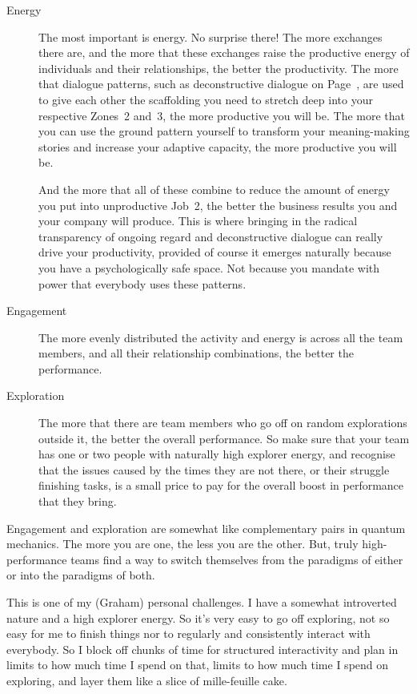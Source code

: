 \begin{description}
\item[Energy] The most important is energy.  No surprise there! The more exchanges there are, and the more that these exchanges raise the productive energy of individuals and their relationships, the better the productivity. The more that dialogue patterns, such as deconstructive dialogue on Page~\pageref{section:deconstructive-criticism}, are used to give each other the scaffolding you need to stretch deep into your respective Zones~2 and~3, the more productive you will be. The more that you can use the ground pattern yourself to transform your meaning\hyp{}making stories and increase your adaptive capacity, the more productive you will be. 


And the more that all of these combine to reduce the amount of energy you put into unproductive Job~2, the better the business results you and your company will produce. This is where bringing in the radical transparency of ongoing regard and deconstructive dialogue can really drive your productivity\cite{mueller-why-larger-teams-perform-worse}, provided of course it emerges naturally because you have a psychologically safe space. Not because you mandate with power that everybody uses these patterns.


\item[Engagement] The more evenly distributed the activity and energy is across all the team members, and all their relationship combinations, the better the performance.


\item[Exploration] The more that there are team members who go off on random explorations outside it, the better the overall performance. So make sure that your team has one or two people with naturally high explorer energy, and recognise that the issues caused by the times they are not there, or their struggle finishing tasks, is a small price to pay for the overall boost in performance that they bring.
\end{description} 


Engagement and exploration are somewhat like complementary pairs in quantum mechanics. The more you are one, the less you are the other. But, truly high-performance teams find a way to switch themselves from the paradigms of either or into the paradigms of both. 


\begin{longstoryblock} 
This is one of my (Graham) personal challenges. I have a somewhat introverted nature and a high explorer energy. So it's very easy to go off exploring, not so easy for me to finish things nor to regularly and consistently interact with everybody. So I block off chunks of time for structured interactivity and plan in limits to how much time I spend on that, limits to how much time I spend on exploring, and layer them like a slice of mille-feuille cake.
\end{longstoryblock}


